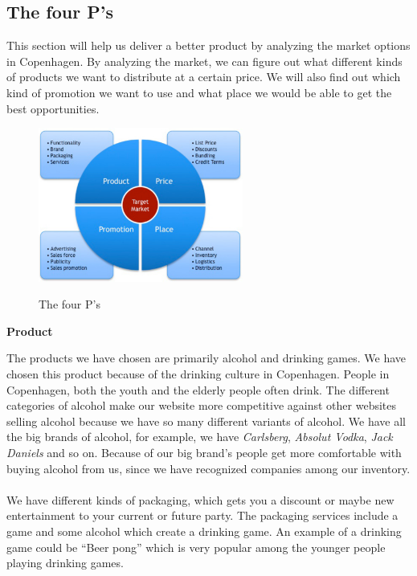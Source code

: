 \documentclass[12p]{article}
\begin{document}
\newpage


\subsection{The four P's}

This section will help us deliver a better product by analyzing the market options in Copenhagen. By analyzing the market, we can figure out what different kinds of products we want to distribute at a certain price. We will also find out which kind of promotion we want to use and what place we would be able to get the best opportunities. 

\begin{figure}[h]
    \center
    \includegraphics[width=0.6\textwidth]{4p}
    \label{PPPP}
    \caption{The four P's}
\end{figure}

\textbf{Product}

The products we have chosen are primarily alcohol and drinking games. We have chosen this product because of the drinking culture in Copenhagen. People in Copenhagen, both the youth and the elderly people often drink. The different categories of alcohol make our website more competitive against other websites selling alcohol because we have so many different variants of alcohol. We have all the big brands of alcohol, for example, we have \emph{Carlsberg}, \emph{Absolut Vodka}, \emph{Jack Daniels} and so on. Because of our big brand's people get more comfortable with buying alcohol from us, since we have recognized companies among our inventory.
\\ \\
We have different kinds of packaging, which gets you a discount or maybe new entertainment to your current or future party. The packaging services include a game and some alcohol which create a drinking game. An example of a drinking game could be “Beer pong” which is very popular among the younger people playing drinking games. \\
\end{document}
